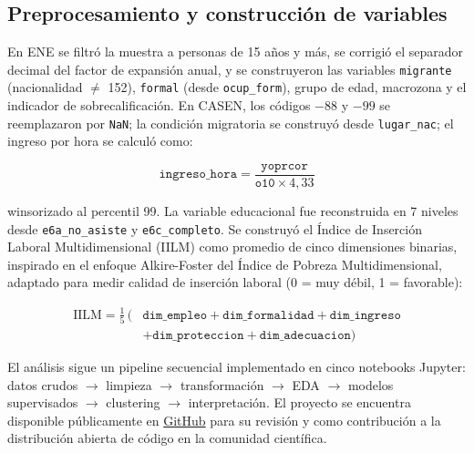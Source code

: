 


\subsection{Preprocesamiento y construcción de variables}



En ENE se filtró la muestra a personas de 15 años y más, se corrigió el separador decimal del factor de expansión anual, y se construyeron las variables \texttt{migrante} (nacionalidad $\neq$ 152), \texttt{formal} (desde \texttt{ocup\_form}), grupo de edad, macrozona y el indicador de sobrecalificación. En CASEN, los códigos $-88$ y $-99$ se reemplazaron por \texttt{NaN}; la condición migratoria se construyó desde \texttt{lugar\_nac}; el ingreso por hora se calculó como:

$$
	\texttt{ingreso\_hora} = \frac{\texttt{yoprcor}}{\texttt{o10} \times 4{,}33}
$$

winsorizado al percentil 99. La variable educacional fue reconstruida en 7 niveles desde \texttt{e6a\_no\_asiste} y \texttt{e6c\_completo}. Se construyó el Índice de Inserción Laboral Multidimensional (IILM) como promedio de cinco dimensiones binarias, inspirado en el enfoque Alkire-Foster del Índice de Pobreza Multidimensional, adaptado para medir calidad de inserción laboral (0 = muy débil, 1 = favorable):

\begin{align*}
	\text{IILM} = \frac{1}{5}\,\big(& \texttt{dim\_empleo} + \texttt{dim\_formalidad} + \texttt{dim\_ingreso} \\
	&+ \texttt{dim\_proteccion} + \texttt{dim\_adecuacion} \big)
\end{align*}

El análisis sigue un pipeline secuencial implementado en cinco notebooks Jupyter: datos crudos $\rightarrow$ limpieza $\rightarrow$ transformación $\rightarrow$ EDA $\rightarrow$ modelos supervisados $\rightarrow$ clustering $\rightarrow$ interpretación. El proyecto se encuentra disponible públicamente en \href{https://github.com/ElK1000o/investigacion-ia}{GitHub} para su revisión y como contribución a la distribución abierta de código en la comunidad científica.

